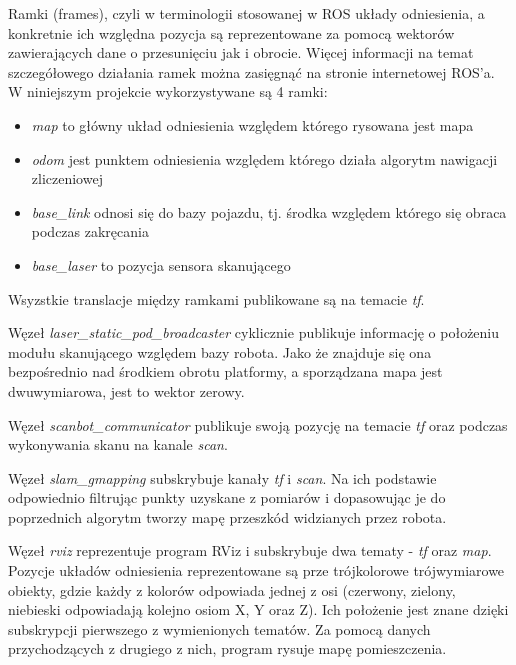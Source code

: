Ramki (frames), czyli w terminologii stosowanej w ROS układy odniesienia, a konkretnie ich względna pozycja są reprezentowane za pomocą wektorów zawierających dane o przesunięciu jak i obrocie. Więcej informacji na temat szczegółowego działania ramek można zasięgnąć na stronie internetowej ROS'a\cite{ros}. W niniejszym projekcie wykorzystywane są 4 ramki:
\begin{itemize}
    \item \emph{map} to główny układ odniesienia względem którego rysowana jest mapa
    \item \emph{odom} jest punktem odniesienia względem którego działa algorytm nawigacji zliczeniowej
    \item \emph{base\_link} odnosi się do bazy pojazdu, tj. środka względem którego się obraca podczas zakręcania
    \item \emph{base\_laser} to pozycja sensora skanującego
\end{itemize}
Wsyzstkie translacje między ramkami publikowane są na temacie \emph{tf}.

Węzeł \emph{laser\_static\_pod\_broadcaster} cyklicznie publikuje informację o położeniu modułu skanującego względem bazy robota. Jako że znajduje się ona bezpośrednio nad środkiem obrotu platformy, a sporządzana mapa jest dwuwymiarowa, jest to wektor zerowy.

Węzeł \emph{scanbot\_communicator} publikuje swoją pozycję na temacie \emph{tf} oraz podczas wykonywania skanu na kanale \emph{scan}.

Węzeł \emph{slam\_gmapping} subskrybuje kanały \emph{tf} i \emph{scan}. Na ich podstawie odpowiednio filtrując punkty uzyskane z pomiarów i dopasowując je do poprzednich algorytm tworzy mapę przeszkód widzianych przez robota.

Węzeł \emph{rviz} reprezentuje program RViz i subskrybuje dwa tematy - \emph{tf} oraz \emph{map}. Pozycje układów odniesienia reprezentowane są prze trójkolorowe trójwymiarowe obiekty, gdzie każdy z kolorów odpowiada jednej z osi (czerwony, zielony, niebieski odpowiadają kolejno osiom X, Y oraz Z). Ich położenie jest znane dzięki subskrypcji pierwszego z wymienionych tematów. Za pomocą danych przychodzących z drugiego z nich, program rysuje mapę pomieszczenia.


